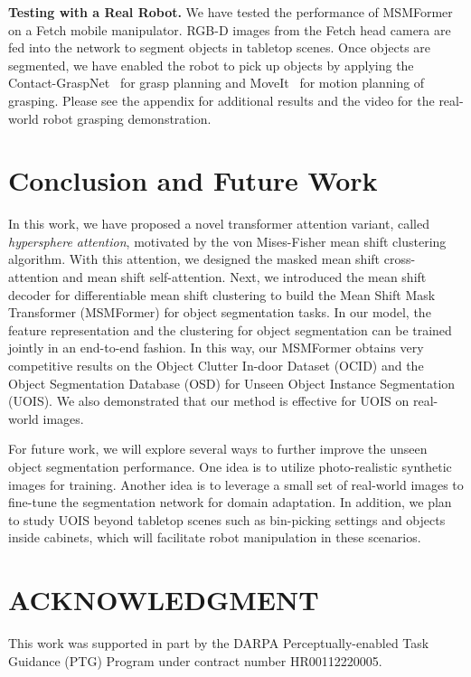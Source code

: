 \documentclass[letterpaper, 10 pt, conference]{ieeeconf}
\begin{document}
\textbf{Testing with a Real Robot.} We have tested the performance of MSMFormer on a Fetch mobile manipulator. RGB-D images from the Fetch head camera are fed into the network to segment objects in tabletop scenes. Once objects are segmented, we have enabled the robot to pick up objects by applying the Contact-GraspNet~\cite{sundermeyer2021contact} for grasp planning and MoveIt~\cite{chitta2012moveit} for motion planning of grasping. Please see the appendix for additional results and the video for the real-world robot grasping demonstration. 
\vspace{-1mm}
\section{Conclusion and Future Work}
\vspace{-1mm}
In this work, we have proposed a novel transformer attention variant, called \emph{hypersphere attention}, motivated by the von Mises-Fisher mean shift clustering algorithm. With this attention, we designed the masked mean shift cross-attention and mean shift self-attention. Next, we introduced the mean shift decoder for differentiable mean shift clustering to build the Mean Shift Mask Transformer (MSMFormer) for object segmentation tasks. In our model, the feature representation and the clustering for object segmentation can be trained jointly in an end-to-end fashion. In this way, our MSMFormer obtains very competitive results on the Object Clutter In-door Dataset (OCID) and the Object Segmentation
Database (OSD) for Unseen Object Instance Segmentation (UOIS). We also demonstrated that our method is effective for UOIS on real-world images.

For future work, we will explore several ways to further improve the unseen object segmentation performance. One idea is to utilize photo-realistic synthetic images for training. Another idea is to leverage a small set of real-world images to fine-tune the segmentation network for domain adaptation. In addition, we plan to study UOIS beyond tabletop scenes such as bin-picking settings and objects inside cabinets, which will facilitate robot manipulation in these scenarios.





























\vspace{-1mm}
\section*{ACKNOWLEDGMENT}
\vspace{-1mm}
This work was supported in part by the DARPA Perceptually-enabled Task Guidance (PTG) Program under contract number HR00112220005.







\end{document}
